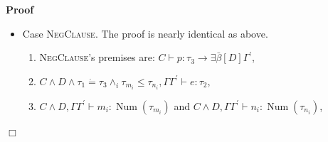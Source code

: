 \documentclass{article}
\newcommand{\tmname}[1]{\textsc{#1}}
\newcommand{\tmop}[1]{\ensuremath{\operatorname{#1}}}
\newenvironment{proof}{\noindent\textbf{Proof\ }}{\hspace*{\fill}$\Box$\medskip}
\begin{document}
\begin{proof}
\begin{itemize}
\begin{enumerate}
      \item By lemma \ref{MonoEnvEq} and weakening, (2) implies $C \wedge D
      \wedge \Gamma^{\prime\prime} \dot{=} \Gamma^{\prime} \wedge_i \alpha^1_i
      \dot{=} \tau_{m_i} \wedge_i \alpha^2_i \dot{=} \tau_{n_i} \wedge_i
      \alpha_i^1 \leq \alpha_i^2, \Gamma \Gamma^{\prime\prime} \vdash e :
      \tau_2$.
      
      \item By (15), {\tmname{Hide}} and (12), we get $C \wedge D^{\prime}
      \wedge_i \alpha^1_i \dot{=} \tau_{m_i}^{\prime} \wedge_i \alpha^2_i
      \dot{=} \tau_{n_i}^{\prime} \wedge_i \alpha_i^1 \leq \alpha_i^2, \Gamma
      \Gamma^{\prime\prime} \vdash e : \tau_2$.
      
      \item By induction hypothesis, (16) gives $\mathcal{I}^3, C \wedge
      D^{\prime} \wedge_i \alpha^1_i \dot{=} \tau_{m_i}^{\prime} \wedge_i
      \alpha^2_i \dot{=} \tau_{n_i}^{\prime} \wedge_i \alpha_i^1 \leq
      \alpha_i^2 \vDash \llbracket \Gamma \Gamma^{\prime\prime} \vdash e :
      \tau_2 \rrbracket$.
      
      \item By (8), (10), (14) and (17), we get $\overline{\mathcal{I}_i^1}
      \overline{\mathcal{I}_i^2} \mathcal{I}^3, C \wedge_i \alpha^1_i \dot{=}
      \tau_{m_i}^{\prime} \wedge_i \alpha^2_i \dot{=} \tau_{n_i}^{\prime}
      \vDash \Phi$.
      
      \item By nonemptiness of the domain, from (18) we get the goal
      $\overline{\mathcal{I}_i^1} \overline{\mathcal{I}_i^2} \mathcal{I}^3, C
      \vDash \exists \overline{\alpha^1_i \alpha^2_i} . \Phi$.
    \end{enumerate}
    \item Case {\tmname{NegClause}}. The proof is nearly identical as above.
    \begin{enumerate}
      \item {\tmname{NegClause}}'s premises are: $C \vdash p : \tau_3
      \longrightarrow \exists \bar{\beta} [D] \Gamma^{\prime}$,
      
      \item $C \wedge D \wedge \tau_1 \dot{=} \tau_3 \wedge_i \tau_{m_i} \leq
      \tau_{n_i}, \Gamma \Gamma^{\prime} \vdash e : \tau_2$,
      
      \item $C \wedge D, \Gamma \Gamma^{\prime} \vdash m_i : \tmop{Num}
      (\tau_{m_i})$ and $C \wedge D, \Gamma \Gamma^{\prime} \vdash n_i :
      \tmop{Num} (\tau_{n_i})$,
      

\end{enumerate}
\end{itemize}
\end{proof}
\end{document}
